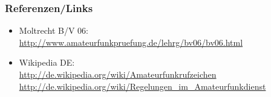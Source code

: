 \begin{frame}
    \frametitle{Referenzen/Links}
    
    \footnotesize
    \begin{itemize}
        \item Moltrecht B/V 06: \\
              \url{http://www.amateurfunkpruefung.de/lehrg/bv06/bv06.html}
        \item Wikipedia DE: \\
              \url{http://de.wikipedia.org/wiki/Amateurfunkrufzeichen} \\
              \url{http://de.wikipedia.org/wiki/Regelungen_im_Amateurfunkdienst}
    \end{itemize}

\end{frame}


